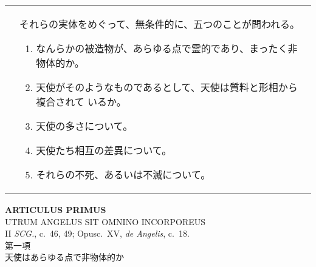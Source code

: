 \documentclass[10pt]{jsarticle} %
\begin{document}
\begin{longtable}{p{21em}p{21em}}
&

それらの実体をめぐって、無条件的に、五つのことが問われる。

\begin{enumerate}
 \item なんらかの被造物が、あらゆる点で霊的であり、まったく非物体的か。
 \item 天使がそのようなものであるとして、天使は質料と形相から複合されて
       いるか。
 \item 天使の多さについて。
 \item 天使たち相互の差異について。
 \item それらの不死、あるいは不滅について。

\end{enumerate}

\end{longtable}

\newpage


\begin{center}
 {\Large {\bf ARTICULUS PRIMUS}}\\
 {\large UTRUM ANGELUS SIT OMNINO INCORPOREUS}\\
 {\footnotesize II {\itshape SCG.}, c.~46, 49; Opusc.~XV, {\itshape de
 Angelis}, c.~18.}\\
 {\Large 第一項\\天使はあらゆる点で非物体的か}
\end{center}
\end{document}
